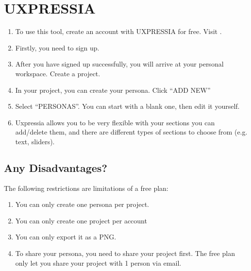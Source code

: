 \documentclass[letterpaper,10pt,english]{jupyterBook}
\begin{document}
\section{UXPRESSIA}
\label{\detokenize{appendices/appendix_c/personas_guide:uxpressia}}\begin{enumerate}
%
\item {} 
\sphinxAtStartPar
To use this tool, create an account with UXPRESSIA for free. Visit
.

\item {} 
\sphinxAtStartPar
Firstly, you need to sign up.

\item {} 
\sphinxAtStartPar
After you have signed up successfully, you will arrive at your personal workspace. Create a project.

\item {} 
\sphinxAtStartPar
In your project, you can create your persona. Click “ADD NEW”

\item {} 
\sphinxAtStartPar
Select “PERSONAS”. You can start with a blank one, then edit it yourself.

\item {} 
\sphinxAtStartPar
Uxpressia allows you to be very flexible with your sections \sphinxhyphen{} you can add/delete them, and there are different
types of sections to choose from (e.g. text, sliders).

\end{enumerate}


\subsection{Any Disadvantages?}
\label{\detokenize{appendices/appendix_c/personas_guide:id3}}
\sphinxAtStartPar
The following restrictions are limitations of a free plan:
\begin{enumerate}
%
\item {} 
\sphinxAtStartPar
You can only create one persona per project.

\item {} 
\sphinxAtStartPar
You can only create one project per account

\item {} 
\sphinxAtStartPar
You can only export it as a PNG.

\item {} 
\sphinxAtStartPar
To share your persona, you need to share your project first. The free plan only let you share your project with
1 person via email.

\end{enumerate}
\end{document}
